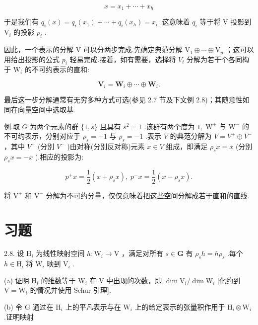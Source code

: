 \[
x = {x}_{1} + \cdots  + {x}_{h}
\]

于是我们有 \({q}_{i}\left( x\right)  = {q}_{i}\left( {x}_{1}\right)  + \cdots  + {q}_{i}\left( {x}_{h}\right)  = {x}_{i}\) .这意味着 \({q}_{i}\) 等于将 \(\mathrm{V}\) 投影到 \({\mathrm{V}}_{i}\) 的投影 \({p}_{i}\) .

因此，一个表示的分解 \(\mathrm{V}\) 可以分两步完成.先确定典范分解 \({\mathrm{V}}_{1} \oplus  \cdots  \oplus  {\mathrm{V}}_{n}\) ；这可以用给出投影的公式 \({p}_{i}\) 轻易完成.接着，如有需要，选择将 \({V}_{i}\) 分解为若干个各同构于 \({\mathrm{W}}_{i}\) 的不可约表示的直和:

\[
{\mathbf{V}}_{i} = {\mathbf{W}}_{i} \oplus  \cdots  \oplus  {\mathbf{W}}_{i}.
\]

最后这一步分解通常有无穷多种方式可选(参见 2.7 节及下文例 2.8)；其随意性如同在向量空间中选取基.

例.取 \(G\) 为两个元素的群 \(\{ 1,s\}\) 且具有 \({s}^{2} = 1\) .该群有两个度为 \(1,{\mathrm{\;W}}^{ + }\) 与 \({\mathrm{W}}^{ - }\) 的不可约表示，分别对应于 \({\rho }_{s} =  + 1\) 与 \({\rho }_{s} =  - 1\) .表示 \(V\) 的典范分解为 \(V = {V}^{ + } \oplus  {V}^{ - }\) ，其中 \({V}^{ + }\) (分别 \({V}^{ - }\) )由对称(分别反对称)元素 \(x \in  V\) 组成，即满足 \({\rho }_{s}x = x\) (分别 \({\rho }_{s}x =  - x\) ).相应的投影为:

\[
{p}^{ + }x = \frac{1}{2}\left( {x + {\rho }_{s}x}\right) ,\;{p}^{ - }x = \frac{1}{2}\left( {x - {\rho }_{s}x}\right) .
\]

将 \({\mathrm{V}}^{ + }\) 和 \({\mathrm{V}}^{ - }\) 分解为不可约分量，仅仅意味着把这些空间分解成若干直和的直线.

\section*{习题}

2.8. 设 \({\mathrm{H}}_{i}\) 为线性映射空间 \(h : {\mathrm{W}}_{i} \rightarrow  \mathrm{V}\) ，满足对所有 \(s \in  \mathbf{G}\) 有 \({\rho }_{s}h = h{\rho }_{s}\) .每个 \(h \in  {\mathrm{H}}_{i}\) 将 \({\mathrm{W}}_{i}\) 映到 \({\mathrm{V}}_{i}\) .

(a) 证明 \({\mathrm{H}}_{i}\) 的维数等于 \({\mathrm{W}}_{i}\) 在 \(\mathrm{V}\) 中出现的次数，即 \(\dim {\mathrm{V}}_{i}/\dim {\mathrm{W}}_{i}\) [化约到 \(\mathrm{V} = {\mathrm{W}}_{i}\) 的情况并使用 Schur 引理].

(b) 令 \(\mathrm{G}\) 通过在 \({\mathrm{H}}_{i}\) 上的平凡表示与在 \({\mathrm{W}}_{i}\) 上的给定表示的张量积作用于 \({\mathrm{H}}_{i} \otimes  {\mathrm{W}}_{i}\) .证明映射

